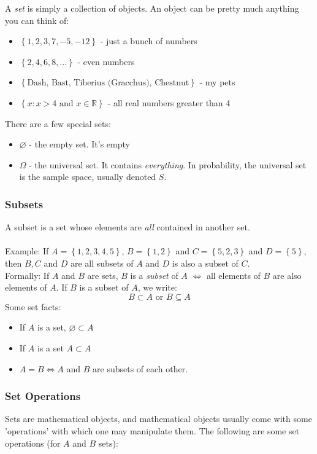 \documentclass[12pt]{article} %
\begin{document}
A \emph{set} is simply a collection of objects. An object can be pretty much anything you can think of:

\begin{itemize}
\item $\left\{1,2,3,7,-5,-12\right\}$ - just a bunch of numbers
\item $\left\{2,4,6,8,...\right\}$ - even numbers
\item $\left\{\textrm{Dash, Bast, Tiberius (Gracchus), Chestnut}\right\}$ - my pets
\item $\left\{x:x>4\textrm{ and } x\in\mathbb{R}\right\}$ - all real numbers greater than 4
\end{itemize}

There are a few special sets:

\begin{itemize}
\item $\varnothing$ - the empty set. It's empty \smiley
\item $\Omega$ - the universal set. It contains \emph{everything}. In probability, the universal set is the sample space, usually denoted $S$.
\end{itemize}
\subsubsection{Subsets}
A subset is a set whose elements are \emph{all} contained in another set.\\\\
Example: If $A=\left\{1,2,3,4,5\right\}$, $B=\left\{1,2\right\}$ and $C=\left\{5,2,3\right\}$ and $D=\left\{5\right\}$, then $B,C$ and $D$ are all subsets of $A$ and $D$ is also a subset of $C$.\\

Formally: If $A$ and $B$ are sets, $B$ is a \emph{subset} of $A$ $\iff$ all elements of $B$ are also elements of $A$. If $B$ is a subset of $A$, we write:
$$B\subset A \textrm{ or } B\subseteq A$$ 
Some set facts:
\begin{itemize}
\item If $A$ is a set, $\varnothing\subset A$
\item If $A$ is a set $A\subset A$
\item  $A = B \iff A$ and $B$ are subsets of each other.\\
\end{itemize}
\subsubsection{Set Operations}
Sets are mathematical objects, and mathematical objects usually come with some 'operations' with which one may manipulate them. The following are some set operations (for $A$ and $B$ sets):
\end{document}
